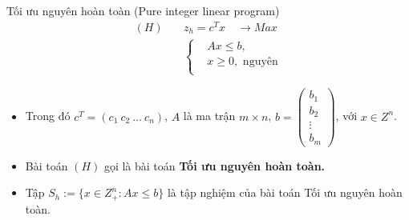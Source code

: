 \documentclass{beamer}
\begin{document}
\begin{frame}{Tối ưu nguyên hoàn toàn (Pure integer linear program)}
    \begin{equation} \label{H}
        \begin{split}
        (H) \quad & z_h=c^Tx \quad \longrightarrow Max \\
                  & \left\{\begin{split}
                    &Ax \leq  b, \\
                    &x \geq 0, \text{ nguyên} \\
                    \end{split}\right.    
        \end{split}
        \end{equation}            
    \begin{itemize} \small
    \item Trong đó $c^T=(c_1 \: c_2 \: \ldots \: c_n)$, $A$ là ma trận $m\times n$, $b=\begin{pmatrix}
        b_1 \\
        b_2 \\
        \vdots \\
        b_m
        \end{pmatrix}$, với $x\in Z^n$.
    \item Bài toán $(H)$ gọi là bài toán \textbf{Tối ưu nguyên hoàn toàn.}
    \item Tập $S_h:=\{x\in Z^n_+: Ax\leq b\}$ là tập nghiệm của bài toán Tối ưu nguyên hoàn toàn.
    \end{itemize}
\end{frame}
\end{document}
